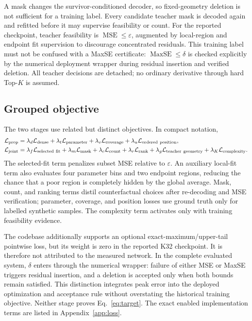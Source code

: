 \documentclass[preprint,12pt]{elsarticle}
\newcommand{\MSE}{\operatorname{MSE}}
\newcommand{\Peak}{\operatorname{MaxSE}}
\begin{document}
A mask changes the survivor-conditioned decoder, so fixed-geometry deletion is
not sufficient for a training label. Every candidate teacher mask is decoded
again and refitted before it may supervise feasibility or count. For the
reported checkpoint, teacher feasibility is $\MSE\leq\varepsilon$, augmented
by local-region and endpoint fit supervision to discourage concentrated
residuals. This training label must not be confused with a MaxSE certificate:
$\Peak\leq\delta$ is checked explicitly by the numerical deployment wrapper
during residual insertion and verified deletion. All teacher decisions are
detached; no ordinary derivative through hard Top-$K$ is assumed.

\subsection{Grouped objective}
The two stages use related but distinct objectives. In compact notation,
\begin{align}
\mathcal L_{\rm prop}={}&
\lambda_d\mathcal L_{\rm dense}
+\lambda_t\mathcal L_{\rm parameter}
+\lambda_v\mathcal L_{\rm coverage}
+\lambda_u\mathcal L_{\rm ordered\ position},\\
\mathcal L_{\rm joint}={}&
\lambda_f\mathcal L_{\rm selected\ fit}
+\lambda_m\mathcal L_{\rm mask}
+\lambda_c\mathcal L_{\rm count}
+\lambda_r\mathcal L_{\rm rank}
+\lambda_g\mathcal L_{\rm teacher\ geometry}
+\lambda_K\mathcal L_{\rm complexity}.
\end{align}
The selected-fit term penalizes subset MSE relative to $\varepsilon$. An
auxiliary local-fit term also evaluates four parameter bins and two endpoint
regions, reducing the chance that a poor region is completely hidden by the
global average. Mask, count, and ranking terms distil counterfactual choices
after re-decoding and MSE verification; parameter, coverage, and position
losses use ground truth only for labelled synthetic samples. The complexity
term activates only with training feasibility evidence.

The codebase additionally supports an optional exact-maximum/upper-tail
pointwise loss, but its weight is zero in the reported K32 checkpoint. It is
therefore not attributed to the measured network. In the complete evaluated
system, $\delta$ enters through the numerical wrapper: failure of either MSE
or MaxSE triggers residual insertion, and a deletion is accepted only when
both bounds remain satisfied. This distinction integrates peak error into the
deployed optimization and acceptance rule without overstating the historical
training objective. Neither stage proves Eq.~\eqref{eq:target}.
The exact enabled implementation terms are listed in Appendix~\ref{app:loss}.
\end{document}
